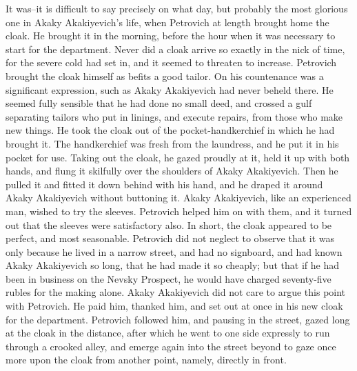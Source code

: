 It was--it is difficult to say precisely on what day, but probably the
most glorious one in Akaky Akakiyevich's life, when Petrovich at
length brought home the cloak. He brought it in the morning, before
the hour when it was necessary to start for the department. Never did
a cloak arrive so exactly in the nick of time, for the severe cold had
set in, and it seemed to threaten to increase. Petrovich brought the
cloak himself as befits a good tailor. On his countenance was a
significant expression, such as Akaky Akakiyevich had never beheld
there. He seemed fully sensible that he had done no small deed, and
crossed a gulf separating tailors who put in linings, and execute
repairs, from those who make new things. He took the cloak out of the
pocket-handkerchief in which he had brought it. The handkerchief was
fresh from the laundress, and he put it in his pocket for use. Taking
out the cloak, he gazed proudly at it, held it up with both hands, and
flung it skilfully over the shoulders of Akaky Akakiyevich. Then he
pulled it and fitted it down behind with his hand, and he draped it
around Akaky Akakiyevich without buttoning it. Akaky Akakiyevich, like
an experienced man, wished to try the sleeves. Petrovich helped him on
with them, and it turned out that the sleeves were satisfactory also.
In short, the cloak appeared to be perfect, and most seasonable.
Petrovich did not neglect to observe that it was only because he lived
in a narrow street, and had no signboard, and had known Akaky
Akakiyevich so long, that he had made it so cheaply; but that if he
had been in business on the Nevsky Prospect, he would have charged
seventy-five rubles for the making alone. Akaky Akakiyevich did not
care to argue this point with Petrovich. He paid him, thanked him, and
set out at once in his new cloak for the department. Petrovich
followed him, and pausing in the street, gazed long at the cloak in
the distance, after which he went to one side expressly to run through
a crooked alley, and emerge again into the street beyond to gaze once
more upon the cloak from another point, namely, directly in front.

